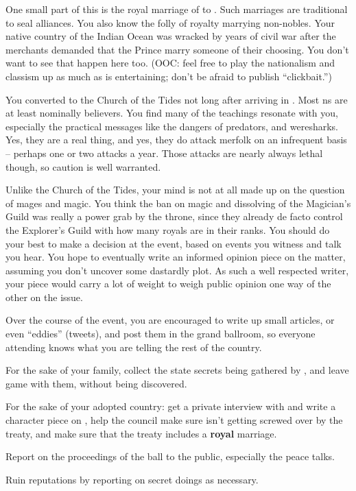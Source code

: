 \documentclass[char]{NeptuneBall}
\begin{document}
One small part of this is the royal marriage of \cPrincess{} to \cPrince{}. Such marriages are traditional to seal alliances. You also know the folly of royalty marrying non-nobles. Your native country of the Indian Ocean was wracked by years of civil war after the merchants demanded that the Prince marry someone of their choosing. You don't want to see that happen here too. (OOC: feel free to play the nationalism and classism up as much as is entertaining; don't be afraid to publish ``clickbait.'')

You converted to the Church of the Tides not long after arriving in \pAtlantis{}. Most \pAtlantis{}ns are at least nominally believers. You find many of the teachings resonate with you, especially the practical messages like the dangers of predators, and weresharks. Yes, they are a real thing, and yes, they do attack merfolk on an infrequent basis -- perhaps one or two attacks a year. Those attacks are nearly always lethal though, so caution is well warranted.

Unlike the Church of the Tides, your mind is not at all made up on the question of mages and magic. You think the ban on magic and dissolving of the Magician's Guild was really a power grab by the throne, since they already de facto control the Explorer’s Guild with how many royals are in their ranks. You should do your best to make a decision at the event, based on events you witness and talk you hear. You hope to eventually write an informed opinion piece on the matter, assuming you don't uncover some dastardly plot. As such a well respected writer, your piece would carry a lot of weight to weigh public opinion one way of the other on the issue.

Over the course of the event, you are encouraged to write up small articles, or even “eddies” (tweets), and post them in the grand ballroom, so everyone attending knows what you are telling the rest of the country.

\begin{itemz}[Goals]
  \item For the sake of your family, collect the state secrets being gathered by \cWillow{}, and leave game with them, without being discovered.
	\item For the sake of your adopted country: get a private interview with \cPrince{} and write a character piece on \cPrince{\them}, help the council make sure \pAtlantis{} isn't getting screwed over by the treaty, and make sure that the treaty includes a \textbf{royal} marriage.
	\item Report on the proceedings of the ball to the public, especially the peace talks.
	\item Ruin reputations by reporting on secret doings as necessary.
\end{itemz}
\end{document}
